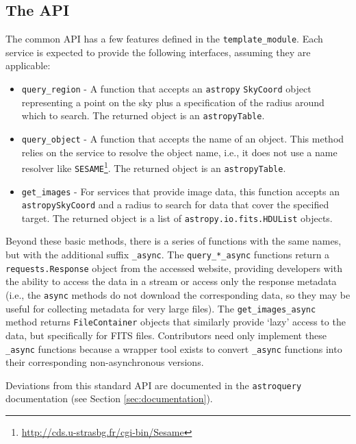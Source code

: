 \documentclass[twocolumn]{aastex62}
\newcommand{\package}[1]{\texttt{#1}\xspace}
\newcommand{\astroquery}{\package{astroquery}}
\newcommand{\astropypkg}{\package{astropy}}
\begin{document}
\subsection{The API}
The common API has a few features defined in the \texttt{template\_module}.
Each service is expected to provide the following interfaces, assuming they are
applicable:

\begin{itemize}
    \item \texttt{query\_region} - A function that accepts an \astropypkg
        \texttt{SkyCoord} object representing a point on the sky plus a
        specification of the radius around which to search.
        The returned object is an \astropypkg \texttt{Table}.
    \item \texttt{query\_object} - A function that accepts the name of an
        object.  This method relies on the service to resolve the object name, i.e., it does not use a name resolver
        like \texttt{SESAME}\footnote{\url{http://cds.u-strasbg.fr/cgi-bin/Sesame}}.
        The returned object is an \astropypkg \texttt{Table}.
    \item \texttt{get\_images} - For services that provide image data, this
        function accepts an \astropypkg \texttt{SkyCoord} and a radius to search for data
        that cover the specified target. The returned object is a list
        of \texttt{astropy.io.fits.HDUList} objects.

\end{itemize}

Beyond these basic methods, there is a series of functions with the same
names, but with the additional suffix \texttt{\_async}.  The
\texttt{query\_*\_async} functions return a \texttt{requests.Response} object
from the accessed website, providing developers with
the ability to access the data in a stream or access only the response
metadata (i.e., the \texttt{async} methods do not download the corresponding
data, so they may be useful for collecting metadata for very large files).  The
\texttt{get\_images\_async} method returns
\texttt{FileContainer} objects that similarly provide `lazy' access to the
data, but specifically for FITS files.  Contributors need only implement
these \texttt{\_async} functions because a wrapper tool exists to convert
\texttt{\_async} functions into their corresponding non-asynchronous versions.

Deviations from this standard API are documented in the \astroquery
documentation (see Section \ref{sec:documentation}).
\end{document}
